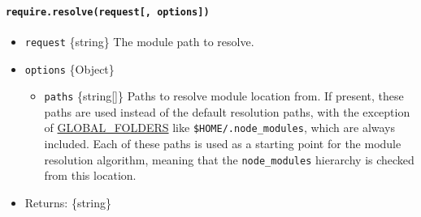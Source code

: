 \begin{Shaded}
\begin{Highlighting}[]
  \OperatorTok{:} \OperatorTok{,}
  \OperatorTok{:} \OperatorTok{,}
  \OperatorTok{:}\NormalTok{ \{\}}\OperatorTok{,}
  \OperatorTok{:} \OperatorTok{,}
  \OperatorTok{:} \OperatorTok{,}
  \OperatorTok{:}\NormalTok{ []}\OperatorTok{,}
  \OperatorTok{:}
\NormalTok{   [ }\OperatorTok{,}
     \OperatorTok{,}
     \OperatorTok{,}
     \NormalTok{ ] \}}
\end{Highlighting}
\end{Shaded}

\paragraph{\texorpdfstring{\texttt{require.resolve(request{[},\ options{]})}}{require.resolve(request{[}, options{]})}}\label{require.resolverequest-options}

\begin{itemize}
\tightlist
\item
  \texttt{request} \{string\} The module path to resolve.
\item
  \texttt{options} \{Object\}

  \begin{itemize}
  \tightlist
  \item
    \texttt{paths} \{string{[}{]}\} Paths to resolve module location
    from. If present, these paths are used instead of the default
    resolution paths, with the exception of
    \hyperref[loading-from-the-global-folders]{GLOBAL\_FOLDERS} like
    \texttt{\$HOME/.node\_modules}, which are always included. Each of
    these paths is used as a starting point for the module resolution
    algorithm, meaning that the \texttt{node\_modules} hierarchy is
    checked from this location.
  \end{itemize}
\item
  Returns: \{string\}
\end{itemize}

